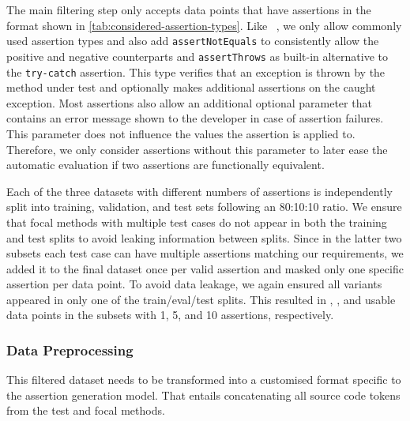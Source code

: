 The main filtering step only accepts data points that have assertions
in the format shown in \cref{tab:considered-assertion-types}.
Like \toga~\cite{Dinella2022}, we only allow commonly used \junit
assertion types and also add \texttt{assertNotEquals} to consistently
allow the positive and negative counterparts and \texttt{assertThrows}
as built-in alternative to the \texttt{try-catch} assertion. This type
verifies that an exception is thrown by the method under test and
optionally makes additional assertions on the caught exception.
Most \junit assertions also allow an additional optional parameter
that contains an error message shown to the developer in case of
assertion failures. This parameter does not influence the values the
assertion is applied to. Therefore, we only consider assertions
without this parameter to later ease the automatic evaluation if two
assertions are functionally equivalent.

Each of the three datasets with different numbers of assertions is
independently split into training, validation, and test sets following
an 80:10:10 ratio. We ensure that focal methods with multiple test
cases do not appear in both the training and test splits to avoid
leaking information between splits.
Since in the latter two subsets each test case can have multiple
assertions matching our requirements, we added it to the final dataset
once per valid assertion and masked only one specific assertion per
data point. To avoid data leakage, we again ensured all variants
appeared in only one of the train/eval/test splits.
This resulted in , , and 
usable data points in the subsets with 1, 5, and 10 assertions,
respectively.


\subsubsection{Data Preprocessing}\label{sec:data-preprocessing}

This filtered dataset needs to be transformed into a customised format
specific to the assertion generation model. That entails concatenating
all source code tokens from the test and focal methods.

